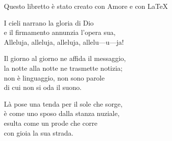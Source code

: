 \documentclass[11pt]{book}
\begin{document}
\begin{center}
{\footnotesize Questo libretto è stato creato con Amore e con \LaTeX}
\end{center}
\clearpage
\vfill
\settowidth{\versewidth}{Il giorno al giorno ne affida il messaggio,}
\begin{canzone}%
\begin{ritornello}
I cieli narrano la gloria di Dio\\
e il firmamento annunzia l’opera sua,\\
Alleluja, alleluja, alleluja, allelu—u—ja!
\end{ritornello}

Il giorno al giorno ne affida il messaggio,\\
la notte alla notte ne trasmette notizia;\\
non è linguaggio, non sono parole\\
di cui non si oda il suono.

Là pose una tenda per il sole che sorge,\\
è come uno sposo dalla stanza nuziale,\\
esulta come un prode che corre\\
con gioia la sua strada.
\end{canzone}
{}
\introduzione

\membatt
\end{document}
